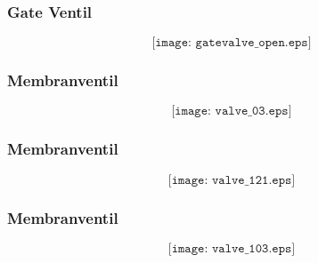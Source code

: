 \documentclass[aspectratio=169,xcolor=dvipsnames]{beamer}
\begin{document}
\begin{frame}
	\frametitle{Gate Ventil}

	$$\texttt{[image: gatevalve\_open.eps]}$$
\end{frame}
%
%
%
%
%
%
%
\begin{frame}
	\frametitle{Membranventil}

	$$\texttt{[image: valve\_03.eps]}$$
\end{frame}

%
%
%
\begin{frame}
	\frametitle{Membranventil}

	$$\texttt{[image: valve\_121.eps]}$$
\end{frame}
%
%
\begin{frame}
	\frametitle{Membranventil}

	$$\texttt{[image: valve\_103.eps]}$$
\end{frame}
\end{document}
